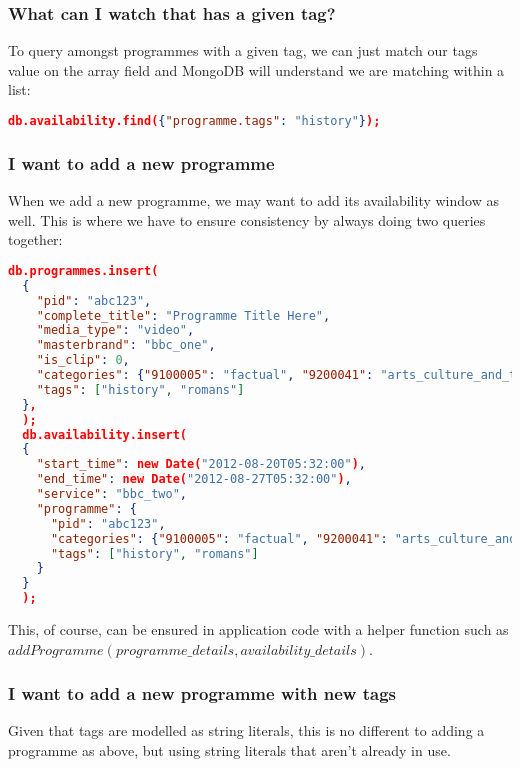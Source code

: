 \documentclass[11pt,a4paper]{article}
\begin{document}
\subsubsection{What can I watch that has a given tag?}

To query amongst programmes with a given tag, we can just match our
tags value on the
array field and MongoDB will understand we are matching within
a list:

\begin{lstlisting}[language=json]
  db.availability.find({"programme.tags": "history"});
\end{lstlisting}

\subsubsection{I want to add a new programme}

When we add a new programme, we may want to add its availability
window as well. This is where we have to ensure consistency by
always doing two queries together:

\begin{lstlisting}[language=json]
  db.programmes.insert(
  {
    "pid": "abc123",
    "complete_title": "Programme Title Here",
    "media_type": "video",
    "masterbrand": "bbc_one",
    "is_clip": 0,
    "categories": {"9100005": "factual", "9200041": "arts_culture_and_the_media"},
    "tags": ["history", "romans"]
  },
  );
  db.availability.insert(
  {
    "start_time": new Date("2012-08-20T05:32:00"),
    "end_time": new Date("2012-08-27T05:32:00"),
    "service": "bbc_two",
    "programme": {
      "pid": "abc123",
      "categories": {"9100005": "factual", "9200041": "arts_culture_and_the_media"},
      "tags": ["history", "romans"]
    }
  }
  );
\end{lstlisting}

This, of course, can be ensured in application code with a helper function
such as $addProgramme(programme\_details, availability\_details)$.

\subsubsection{I want to add a new programme with new tags}

Given that tags are modelled as string literals, this is no different to adding
a programme as above, but using string literals that aren't already in use.

\pagebreak
\end{document}
